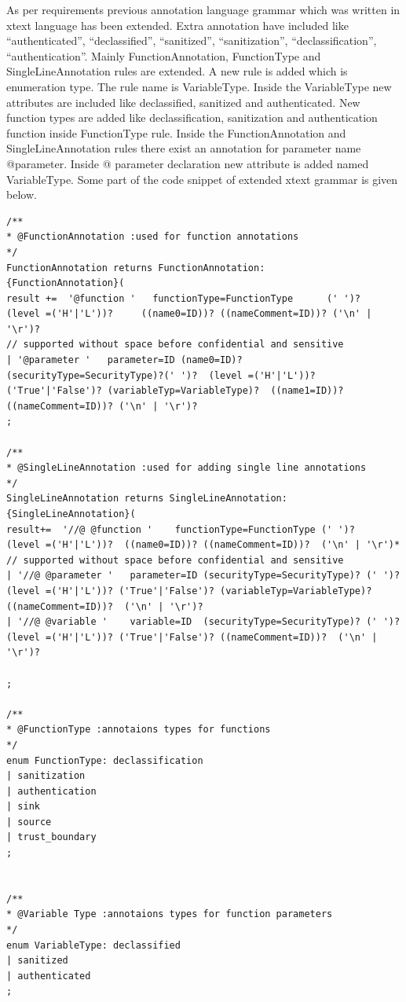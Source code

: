 As per requirements previous annotation language grammar which was written in xtext language has been extended. Extra annotation have included like \enquote{authenticated}, \enquote{declassified}, \enquote{sanitized}, \enquote{sanitization}, \enquote{declassification}, \enquote{authentication}. Mainly FunctionAnnotation, FunctionType  and SingleLineAnnotation rules  are extended. A new rule is added which is enumeration type. The rule name is VariableType. Inside the VariableType new attributes are included like declassified, sanitized and authenticated. New function types are added like declassification, sanitization and authentication function inside FunctionType rule. Inside the FunctionAnnotation and SingleLineAnnotation rules there exist an annotation for parameter name @parameter. Inside @ parameter declaration new attribute is added named VariableType. Some part of the code snippet of extended xtext grammar is given below. 

\begin{lstlisting}
/**
* @FunctionAnnotation :used for function annotations
*/ 
FunctionAnnotation returns FunctionAnnotation:
{FunctionAnnotation}( 
result +=  '@function '   functionType=FunctionType      (' ')?                              (level =('H'|'L'))?     ((name0=ID))? ((nameComment=ID))? ('\n' | '\r')?
// supported without space before confidential and sensitive
| '@parameter '   parameter=ID (name0=ID)? (securityType=SecurityType)?(' ')?  (level =('H'|'L'))? ('True'|'False')? (variableTyp=VariableType)?  ((name1=ID))? ((nameComment=ID))? ('\n' | '\r')?	
;

/**
* @SingleLineAnnotation :used for adding single line annotations
*/ 
SingleLineAnnotation returns SingleLineAnnotation:
{SingleLineAnnotation}(
result+=  '//@ @function '    functionType=FunctionType (' ')?                  (level =('H'|'L'))?  ((name0=ID))? ((nameComment=ID))?  ('\n' | '\r')*
// supported without space before confidential and sensitive
| '//@ @parameter '   parameter=ID (securityType=SecurityType)? (' ')?  (level =('H'|'L'))? ('True'|'False')? (variableTyp=VariableType)?  ((nameComment=ID))?  ('\n' | '\r')?
| '//@ @variable '    variable=ID  (securityType=SecurityType)? (' ')?  (level =('H'|'L'))? ('True'|'False')? ((nameComment=ID))?  ('\n' | '\r')?

;

/**
* @FunctionType :annotaions types for functions
*/ 
enum FunctionType: declassification 
| sanitization
| authentication
| sink
| source
| trust_boundary
;


/**
* @Variable Type :annotaions types for function parameters
*/ 
enum VariableType: declassified 
| sanitized
| authenticated
;	
\end{lstlisting}

